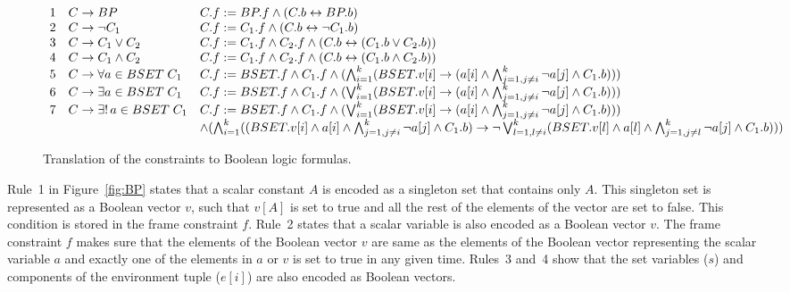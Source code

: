 \begin{figure*}[t]
\[
\begin{array}{lll}
1 & C \rightarrow  BP &
        C.f := BP.f \wedge
        (C.b \leftrightarrow BP.b) \\
2 & C \rightarrow  \neg C_1 &
        C.f := C_1.f \wedge
        (C.b \leftrightarrow \neg C_1.b) \\
3 & C \rightarrow  C_1 \vee C_2 &
        C.f := C_1.f \wedge C_2.f \wedge
        (C.b \leftrightarrow (C_1.b \vee C_2.b)) \\
4 & C \rightarrow  C_1 \wedge C_2 &
        C.f := C_1.f \wedge C_2.f \wedge
        (C.b \leftrightarrow (C_1.b \wedge C_2.b)) \\
5 & C \rightarrow  \forall a \in BSET \; C_1  &
        C.f := BSET.f \wedge C_1.f \wedge
        (\bigwedge_{i=1}^k (BSET.v[i] \rightarrow
         (a[i] \wedge \bigwedge_{j=1,j \neq i}^k \neg a[j] \wedge C_1.b))) \\
6 & C \rightarrow  \exists a \in BSET \; C_1  &
        C.f :=  BSET.f \wedge C_1.f \wedge
        (\bigvee_{i=1}^k (BSET.v[i] \rightarrow
        (a[i] \wedge \bigwedge_{j=1,j \neq i}^k \neg a[j] \wedge C_1.b))) \\
7 & C \rightarrow  \exists ! \, a \in BSET \; C_1  &
  C.f := BSET.f \wedge C_1.f \wedge
  (\bigvee_{i=1}^k (BSET.v[i] \rightarrow
   (a[i] \wedge \bigwedge_{j=1,j \neq i}^k \neg a[j] \wedge C_1.b))) \\
   & & \wedge (\bigwedge_{i=1}^k ((BSET.v[i] \wedge
   a[i] \wedge \bigwedge_{j=1,j \neq i}^k \neg a[j] \wedge C_1.b) 
   \rightarrow \neg \bigvee_{l=1, l \neq i}^k (BSET.v[l] \wedge
   a[l] \wedge \bigwedge_{j=1,j \neq l}^k \neg a[j] \wedge C_1.b)))
\end{array}
\]
\caption{Translation of the constraints to Boolean logic formulas.}
\label{fig:C}
\end{figure*}

Rule~1 in Figure~\ref{fig:BP} states that a scalar constant $A$ is
encoded as a singleton set that contains only $A$.  This singleton set
is represented as a Boolean vector $v$, such that $v[A]$ is set to
true and all the rest of the elements of the vector are set to false.
This condition is stored in the frame constraint $f$.  Rule~2 states
that a scalar variable is also encoded as a Boolean vector $v$.  The
frame constraint $f$ makes sure that the elements of the Boolean
vector $v$ are same as the elements of the Boolean vector representing
the scalar variable $a$ and exactly one of the elements in $a$ or $v$
is set to true in any given time.  Rules~3 and~4 show that the set
variables ($s$) and components of the environment tuple ($e[i]$) are
also encoded as Boolean vectors.

